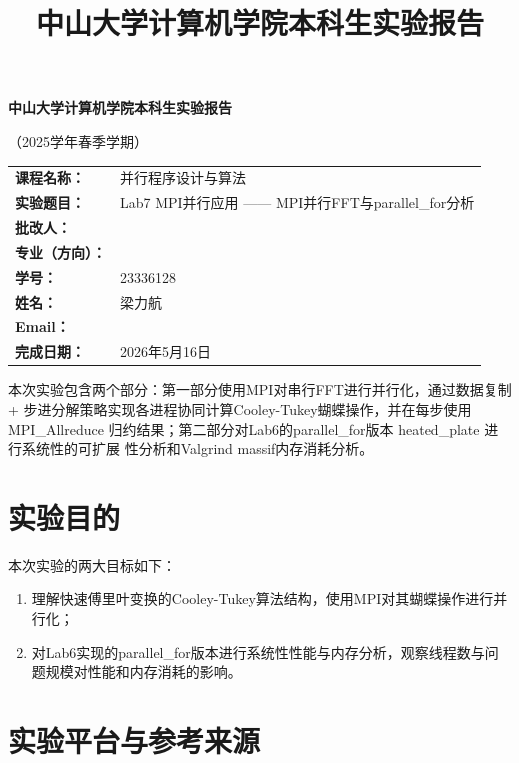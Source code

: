 \documentclass[UTF8,a4paper,12pt,fontset=none]{ctexart}
\title{\bfseries 中山大学计算机学院本科生实验报告}
\author{}
\date{}
\begin{document}
\begin{titlepage}
  \centering
  {\bfseries 中山大学计算机学院本科生实验报告\par}
  \vspace{0.5em}
  {（2025学年春季学期）\par}
  \vspace{2em}

  \begin{tabularx}{0.9\textwidth}{>{\bfseries}p{4cm}X}
    课程名称： & 并行程序设计与算法 \\
    实验题目： & Lab7 MPI并行应用 —— MPI并行FFT与parallel\_for分析 \\
    批改人： & \\
    专业（方向）： & \\
    学号： & 23336128 \\
    姓名： & 梁力航 \\
    Email： & \\
    完成日期： & 2026年5月16日 \\
  \end{tabularx}

  \vfill
  \begin{minipage}{0.88\textwidth}
    \small
    本次实验包含两个部分：第一部分使用MPI对串行FFT进行并行化，通过数据复制+
    步进分解策略实现各进程协同计算Cooley-Tukey蝴蝶操作，并在每步使用MPI\_Allreduce
    归约结果；第二部分对Lab6的parallel\_for版本 heated\_plate 进行系统性的可扩展
    性分析和Valgrind massif内存消耗分析。
  \end{minipage}
\end{titlepage}

\section{实验目的}

本次实验的两大目标如下：
\begin{enumerate}[leftmargin=2.2em]
  \item 理解快速傅里叶变换的Cooley-Tukey算法结构，使用MPI对其蝴蝶操作进行并行化；
  \item 对Lab6实现的parallel\_for版本进行系统性性能与内存分析，观察线程数与问题规模对性能和内存消耗的影响。
\end{enumerate}

\section{实验平台与参考来源}
\end{document}
